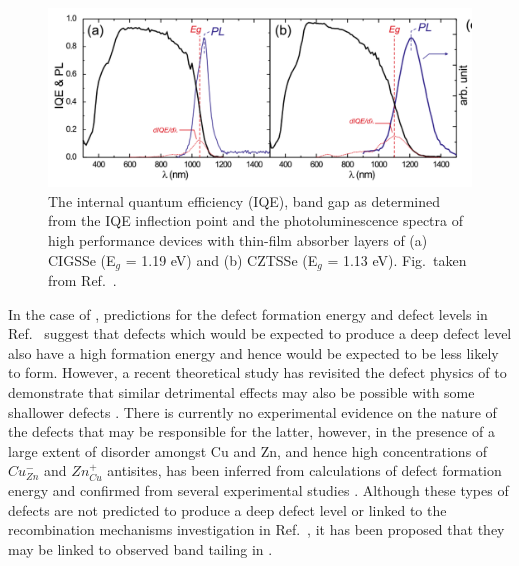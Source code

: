 \documentclass[11pt, twoside]{report}
\begin{document}
\begin{figure}[h!]
  \centering
    \includegraphics[width=1.0\textwidth]{figures/CZTS+CIGS_PL.png}
    \caption[The internal quantum efficiency (IQE), band gap as determined from the IQE inflection point and the photoluminescence spectra of high performance devices with thin-film absorber layers of (a) CIGSSe (E$_g$ = 1.19 eV) and (b) CZTSSe (E$_g$ = 1.13 eV).]{The internal quantum efficiency (IQE), band gap as determined from the IQE inflection point and the photoluminescence spectra of high performance devices with thin-film absorber layers of (a) CIGSSe (E$_g$ = 1.19 eV) and (b) CZTSSe (E$_g$ = 1.13 eV). Fig.~taken from Ref.~.}
  \label{CZTS+CIGS_PL}
\end{figure}

In the case of {\CZTS}, predictions for the defect formation energy and defect levels in Ref.~ suggest that defects which would be expected to produce a deep defect level also have a high formation energy and hence would be expected to be less likely to form.
However, a recent theoretical study has revisited the defect physics of {\CZTS} to demonstrate that similar detrimental effects may also be possible with some shallower defects \cite{Sunghyun_killer_defects}.
There is currently no experimental evidence on the nature of the defects that may be responsible for the latter, however, in {\CZTS} the presence of a large extent of disorder amongst Cu and Zn, and hence high concentrations of $Cu_{Zn}^{-}$ and $Zn_{Cu}^{+}$ antisites, has been inferred from calculations of defect formation energy \cite{defects_Chen} and confirmed from several experimental studies \cite{Schorr, CZTS_Xray, CZTS_TEM}. Although these types of defects are not predicted to produce a deep defect level or linked to the recombination mechanisms investigation in Ref.~, it has been proposed that they may be linked to observed band tailing in {\CZTS} \cite{band_tail}.
\end{document}
